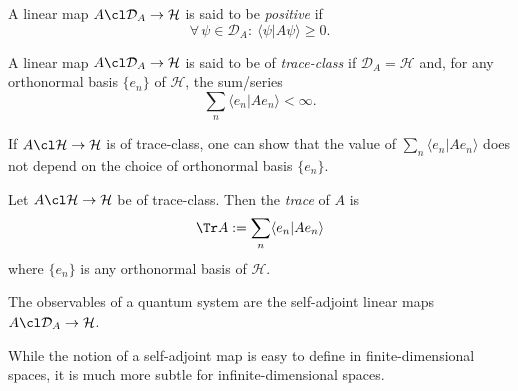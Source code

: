     \begin{definition}
        A linear map $A\cl\mathcal{D}_A\to \mathcal{H}$ is said to be \emph{positive} if 
        \begin{equation*}
            \forall \, \psi\in\mathcal{D}_A : \ \langle\psi|A\psi\rangle\geq 0.
        \end{equation*}
    \end{definition}


    \begin{definition}
        A linear map $A\cl\mathcal{D}_A\to \mathcal{H}$ is said to be of \emph{trace-class} if $\mathcal{D}_A=\mathcal{H}$ and, for any orthonormal basis $\{e_n\}$ of $\mathcal{H}$, the sum/series
        \begin{equation*}
            \sum_n \langle e_n|Ae_n\rangle < \infty.
        \end{equation*}
    \end{definition}
    If $A\cl\mathcal{H}\to \mathcal{H}$ is of trace-class, one can show that the value of $\sum_n \langle e_n|Ae_n\rangle$ does not depend on the choice of orthonormal basis $\{e_n\}$. 
    \begin{definition}
        Let $A\cl\mathcal{H}\to \mathcal{H}$ be of trace-class. Then the \emph{trace} of $A$ is
        \begin{equation*}
            \Tr A :=\sum_n \langle e_n|Ae_n\rangle 
        \end{equation*}
    where $\{e_n\}$ is any orthonormal basis of $\mathcal{H}$.
    \end{definition}
    \begin{tcolorbox}[colframe=blue!10!black]
        \begin{axiom}[Observables]
            The observables of a quantum system are the self-adjoint linear maps $A\cl\mathcal{D}_A\to \mathcal{H}$.
        \end{axiom}
    \end{tcolorbox}
    While the notion of a self-adjoint map is easy to define in finite-dimensional spaces, it is much more subtle for infinite-dimensional spaces.

